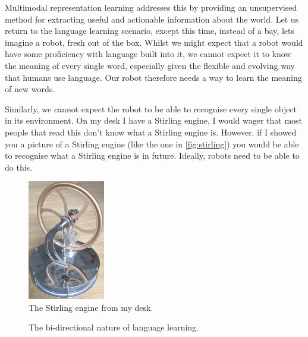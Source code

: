 Multimodal representation learning addresses this by providing an unsupervised method for extracting useful and actionable information about the world. Let us return to the language learning scenario, except this time, instead of a bay, lets imagine a robot, fresh out of the box. Whilst we might expect that a robot would have some proficiency with language built into it, we cannot expect it to know the meaning of every single word, especially given the flexible and evolving way that humans use language. Our robot therefore needs a way to learn the meaning of new words. 

Similarly, we cannot expect the robot to be able to recognise every single object in its environment. On my desk I have a Stirling engine, I would wager that most people that read this don't know what a Stirling engine is. However, if I showed you a picture of a Stirling engine (like the one in \autoref{fig:stirling}) you would be able to recognise what a Stirling engine is in future. Ideally, robots need to be able to do this.

\begin{figure}
\centering
	\includegraphics[width=0.3\textwidth]{Figs/introduction/stirling.jpg}
	\caption{The Stirling engine from my desk.}
	\label{fig:stirling}
\end{figure}

\begin{figure}
\centering
{}
\caption{The bi-directional nature of language learning.}
\label{fig:bi_ll}
\end{figure}

